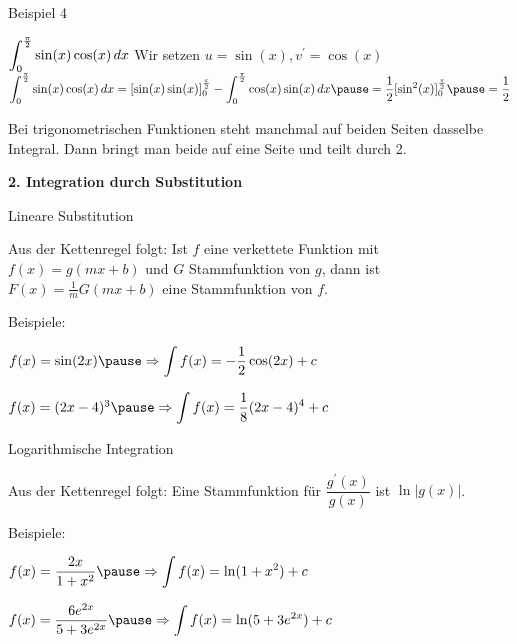 \begin{frame}[fragile]
Beispiel 4
  
$\displaystyle\int_0^{\frac{\pi}{2}} \sin(x)\cos(x) \,dx$  \quad \pause Wir setzen $u = \sin(x), v^{\prime} = \cos(x)$ \\ \pause
$\displaystyle\int_0^\ph \sin(x)\cos(x) \,dx = [\sin(x)\sin(x)]_0^\ph - \displaystyle\int_0^\ph \cos(x)\sin(x) \,dx \pause  = \frac{1}{2}  [\sin^2(x)]_0^\ph \pause = \frac{1}{2}$ \pause

Bei trigonometrischen Funktionen steht manchmal auf beiden Seiten dasselbe Integral. Dann bringt man beide auf eine Seite und teilt durch 2.
\end{frame}

\begin{frame}[fragile]

 \textbf{2. Integration durch Substitution}  

Lineare Substitution \pause
  
Aus der Kettenregel folgt: Ist $f$ eine verkettete Funktion mit $f(x) = g(mx+b)$ und $G$ Stammfunktion von $g$, dann ist $F(x) = \frac{1}{m}G(mx+b)$ eine Stammfunktion von $f$.  \pause

Beispiele: 

$f(x) = \sin(2x) \pause \Rightarrow \displaystyle\int f(x) = -\dfrac{1}{2}\cos(2x)+c$ \pause

$f(x) = (2x-4)^3 \pause \Rightarrow \displaystyle\int f(x)= \dfrac{1}{8} (2x-4)^4+c$
\end{frame}

\begin{frame}[fragile]
 Logarithmische Integration
  
Aus der Kettenregel folgt: Eine Stammfunktion für $\dfrac{g^{\prime}(x)}{g(x)}$ ist $\ln\left|g(x)\right|$. \pause

Beispiele: 

$f(x) = \dfrac{2x}{1+x^2} \pause \Rightarrow \displaystyle\int f(x)  = \ln(1+x^2) + c$ \pause
 

$f(x) = \dfrac{6e^{2x}}{5+3e^{2x}} \pause \Rightarrow \displaystyle\int f(x) = \ln(5+3e^{2x}) +c $
\end{frame}


